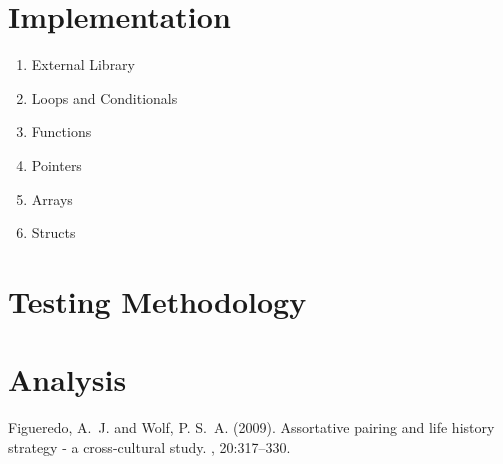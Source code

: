 \documentclass[twoside]{article}
\begin{document}
\begin{multicols}{2}

\section{Implementation}

\begin{enumerate}
  \item External Library
  \item Loops and Conditionals
  \item Functions
  \item Pointers
  \item Arrays
  \item Structs
\end{enumerate}


\section{Testing Methodology}


\section{Analysis}


\begin{thebibliography}{99} %

Figueredo, A.~J. and Wolf, P. S.~A. (2009).
\newblock Assortative pairing and life history strategy - a cross-cultural
  study.
, 20:317--330.
 
\end{thebibliography}


\end{multicols}
\end{document}
